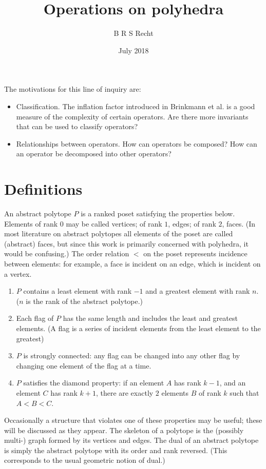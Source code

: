 \documentclass{article}
\title{Operations on polyhedra}
\author{B R S Recht}
\date{July 2018}
\begin{document}
The motivations for this line of inquiry are:
\begin{itemize}
  \item Classification. The inflation factor introduced in Brinkmann et
  al. \cite{brinkmann} is a good measure of the complexity of certain operators.
  Are there more invariants that can be used to classify operators?
  \item Relationships between operators. How can operators be composed? How can
  an operator be decomposed into other operators?
\end{itemize}

\section{Definitions}

An abstract polytope $P$ is a ranked poset satisfying the properties below.
Elements of rank $0$ may be called vertices; of rank $1$, edges; of rank $2$,
faces. (In most literature on abstract polytopes all elements of the poset are
called (abstract) faces, but since this work is primarily concerned with
polyhedra, it would be confusing.) The order relation $<$ on the poset
represents incidence between elements: for example, a face is incident on an
edge, which is incident on a vertex. \cite{arp}
\begin{enumerate}
  \item $P$ contains a least element with rank $-1$ and a greatest
  element with rank $n$. ($n$ is the rank of the abstract polytope.)
  \item Each flag of $P$ has the same length and includes the least and greatest
  elements. (A flag is a series of incident elements from the least element to
  the greatest)
  \item $P$ is strongly connected: any flag can be changed into any other flag
  by changing one element of the flag at a time.
  \item $P$ satisfies the diamond property: if an element $A$ has rank $k-1$,
  and an element $C$ has rank $k+1$, there are exactly $2$ elements $B$ of
  rank $k$ such that $A < B < C$.
\end{enumerate}
Occasionally a structure that violates one of these properties may be useful;
these will be discussed as they appear. The skeleton of a polytope is the
(possibly multi-) graph formed by its vertices and edges.
The dual of an abstract polytope is simply the abstract polytope with its order
and rank reversed. (This corresponds to the usual geometric notion of dual.)
\end{document}
